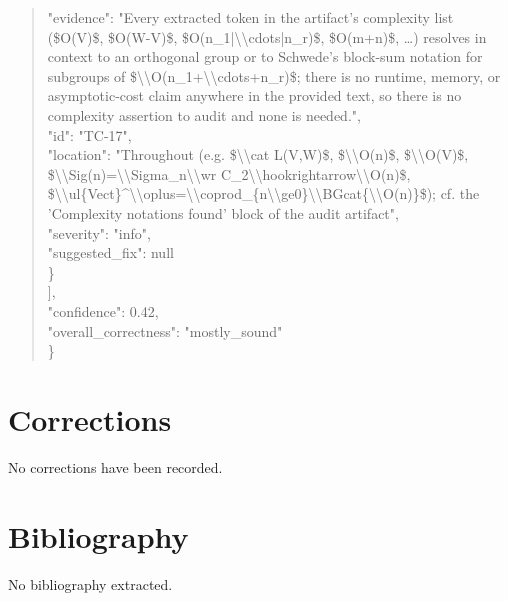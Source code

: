 \documentclass[11pt]{article}
\begin{document}
\begin{quote}
      "evidence": "Every extracted token in the artifact's complexity list (\$O(V)\$, \$O(W-V)\$, \$O(n\_1|\textbackslash{}\textbackslash{}cdots|n\_r)\$, \$O(m+n)\$, …) resolves in context to an orthogonal group or to Schwede's block-sum notation for subgroups of \$\textbackslash{}\textbackslash{}O(n\_1+\textbackslash{}\textbackslash{}cdots+n\_r)\$; there is no runtime, memory, or asymptotic-cost claim anywhere in the provided text, so there is no complexity assertion to audit and none is needed.",\\
      "id": "TC-17",\\
      "location": "Throughout (e.g. \$\textbackslash{}\textbackslash{}cat L(V,W)\$, \$\textbackslash{}\textbackslash{}O(n)\$, \$\textbackslash{}\textbackslash{}O(V)\$, \$\textbackslash{}\textbackslash{}Sig(n)=\textbackslash{}\textbackslash{}Sigma\_n\textbackslash{}\textbackslash{}wr C\_2\textbackslash{}\textbackslash{}hookrightarrow\textbackslash{}\textbackslash{}O(n)\$, \$\textbackslash{}\textbackslash{}ul\{Vect\}\^{}\textbackslash{}\textbackslash{}oplus=\textbackslash{}\textbackslash{}coprod\_\{n\textbackslash{}\textbackslash{}ge0\}\textbackslash{}\textbackslash{}BGcat\{\textbackslash{}\textbackslash{}O(n)\}\$); cf. the 'Complexity notations found' block of the audit artifact",\\
      "severity": "info",\\
      "suggested\_fix": null\\
    \}\\
  ],\\
  "confidence": 0.42,\\
  "overall\_correctness": "mostly\_sound"\\
\}\\
\end{quote}

\section*{Corrections}
No corrections have been recorded.

\section*{Bibliography}
No bibliography extracted.

% 
% 
\end{document}
